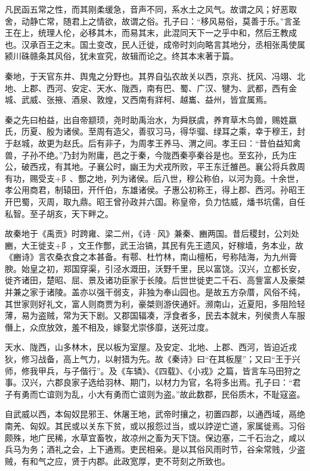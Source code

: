 \documentclass[12pt,UTF8]{ctexbook}
\begin{document}
凡民函五常之性，而其刚柔缓急，音声不同，系水土之风气。故谓之风；好恶取舍，动静亡常，随君上之情欲，故谓之俗。孔子曰：“移风易俗，莫善于乐。”言圣王在上，统理人伦，必移其木，而易其末，此混同天下一之乎中和，然后王教成也。汉承百王之末。国土变改，民人迁徙，成帝时刘向略言其地分，丞相张禹使属颍川硃赣条其风俗，犹未宣究，故辑而论之。终其本末著于篇。



秦地，于天官东井、舆鬼之分野也。其界自弘农故关以西，京兆、抚风、冯翊、北地、上郡、西河、安定、天水、陇西，南有巴、蜀、广汉、犍为、武都，西有金城、武威、张掖、酒泉、敦煌，又西南有牂柯、越巂、益州，皆宜属焉。



秦之先曰柏益，出自帝颛顼，尧时助禹治水，为舜朕虞，养育草木鸟兽，赐姓嬴氏，历夏、殷为诸侯。至周有造父，善驭习马，得华骝、绿耳之乘，幸于穆王，封于赵城，故更为赵氏。后有非子，为周孝王养马、渭之间。孝王曰：“昔伯益知禽兽，子孙不绝。”乃封为附庸，邑之于秦，今陇西秦亭秦谷是也。至玄孙，氏为庄公，破西戎，有其地。子襄公时，幽王为犬戎所败，平王东迁雒邑。襄公将兵救周有功，赐受支+阝、酆之地，列为诸侯。后八世，穆公称伯，以河为竟。十余世，孝公用商君，制辕田，开仟伯，东雄诸侯。子惠公初称王，得上郡、西河。孙昭王开巴蜀，灭周，取九鼎。昭王曾孙政并六国。称皇帝，负力怙威，燔书坑儒，自任私智。至子胡亥，天下畔之。



故秦地于《禹贡》时跨雍、梁二州，《诗·风》兼秦、豳两国。昔后稷封，公刘处豳，大王徙支+阝，文王作酆，武王治镐，其民有先王遗风，好稼墙，务本业，故《豳诗》言农桑衣食之本甚备。有鄠、杜竹林，南山檀柘，号称陆海，为九州膏腴。始皇之初，郑国穿渠，引泾水溉田，沃野千里，民以富饶。汉兴，立都长安，徙齐诸田，楚昭、屈、景及诸功臣家于长陵。后世世徙吏二千石、高訾富人及豪桀并兼之家于诸陵。盖亦以强干弱支，非独为奉山园也。是故五方杂厝，风俗不纯，其世家则好礼文，富人则商贾为利，豪桀则游侠通奸。濒南山，近夏阳，多阻险轻薄，易为盗贼，常为天下剧。又郡国辐凑，浮食者多，民去本就末，列侯贵人车服僭上，众庶放效，羞不相及，嫁娶尤崇侈靡，送死过度。



天水、陇西，山多林木，民以板为室屋。及安定、北地、上郡、西河，皆迫近戎狄，修习战备，高上气力，以射猎为先。故《秦诗》曰“在其板屋”；又曰“王于兴师，修我甲兵，与子偕行”。及《车辚》、《四载》、《小戎》之篇，皆言车马田狩之事。汉兴，六郡良家子选给羽林、期门，以材力为官，名将多出焉。孔子曰：“君子有勇而亡谊则为乱，小大有勇而亡谊则为盗。”故此数郡，民俗质木，不耻寇盗。



自武威以西，本匈奴昆邪王、休屠王地，武帝时攘之，初置四郡，以通西域，鬲绝南羌、匈奴。其民或以关东下贫，或以报怨过当，或以誖逆亡道，家属徙焉。习俗颇殊，地广民稀，水草宜畜牧，故凉州之畜为天下饶。保边塞，二千石治之，咸以兵马为务；酒礼之会，上下通焉。吏民相亲。是以其俗风雨时节，谷籴常贱，少盗贼，有和气之应，贤于内郡。此政宽厚，吏不苛刻之所致也。
\end{document}
